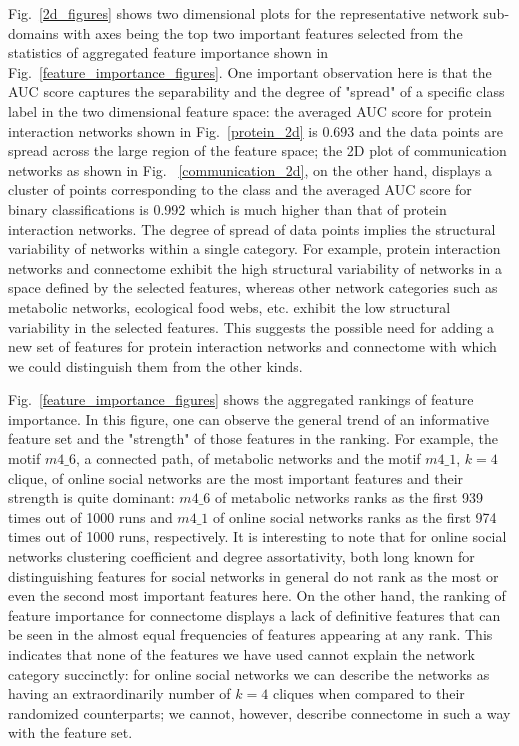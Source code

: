 Fig.~\ref{2d_figures} shows two dimensional plots for the representative network sub-domains with axes being the top two important features selected from the statistics of aggregated feature importance shown in Fig.~\ref{feature_importance_figures}. One important observation here is that the AUC score captures the separability and the degree of "spread" of a specific class label in the two dimensional feature space: the averaged AUC score for protein interaction networks shown in Fig.~\ref{protein_2d} is 0.693 and the data points are spread across the large region of the feature space; the 2D plot of communication networks as shown in Fig.~ \ref{communication_2d}, on the other hand, displays a cluster of points corresponding to the class and the averaged AUC score for binary classifications is 0.992 which is much higher than that of protein interaction networks. The degree of spread of data points implies the structural variability of networks within a single category. For example, protein interaction networks and connectome exhibit the high structural variability of networks in a space defined by the selected features, whereas other network categories such as metabolic networks, ecological food webs, etc. exhibit the low structural variability in the selected features. This suggests the possible need for adding a new set of features for protein interaction networks and connectome with which we could distinguish them from the other kinds. 


Fig.~\ref{feature_importance_figures} shows the aggregated rankings of feature importance. In this figure, one can observe the general trend of an informative feature set and the "strength" of those features in the ranking. For example, the motif $m4\_6$, a connected path, of metabolic networks and the motif $m4\_1$, $k=4$ clique, of online social networks are the most important features and their strength is quite dominant:  $m4\_6$ of metabolic networks ranks as the first 939 times out of 1000 runs and $m4\_1$ of online social networks ranks as the first 974 times  out of 1000 runs, respectively. It is interesting to note that for online social networks clustering coefficient and degree assortativity, both long known for distinguishing features for social networks in general do not rank as the most or even the second most important features here.  On the other hand, the ranking of feature importance for connectome displays a lack of definitive features that can be seen in the almost equal frequencies of features appearing at any rank. This indicates that none of the features we have used cannot explain the network category succinctly: for online social networks we can describe the networks as having an extraordinarily number of $k=4$ cliques when compared to their randomized counterparts; we cannot, however, describe connectome  in such a way with the feature set.



